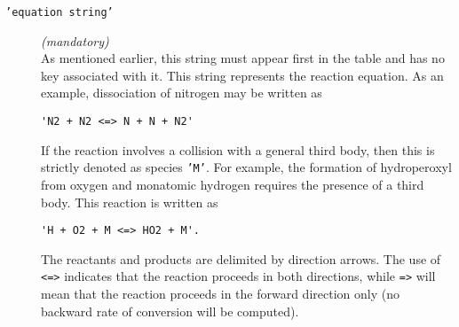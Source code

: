 \begin{description}
  \item[\texttt{'equation string'}] \textit{(mandatory)} \\
    As mentioned earlier, this string must appear first in the table and has no key associated with it.
    This string represents the reaction equation.
    As an example, dissociation of nitrogen may be written as
\begin{verbatim}
'N2 + N2 <=> N + N + N2'
\end{verbatim}
    If the reaction involves a collision with a general third body,
    then this is strictly denoted as species \texttt{'M'}.
    For example, the formation of hydroperoxyl from oxygen and
    monatomic hydrogen requires the presence of a third body.
    This reaction is written as
\begin{verbatim}
'H + O2 + M <=> HO2 + M'.
\end{verbatim}
   The reactants and products are delimited by direction arrows.
   The use of \texttt{<=>} indicates that the reaction proceeds
   in both directions, while \texttt{=>} will mean that the reaction
   proceeds in the forward direction only (no backward
   rate of conversion will be computed).


\end{description}
